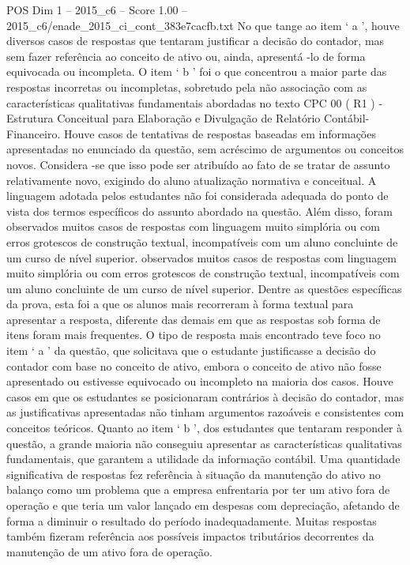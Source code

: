 \begin{textsample}{POS Dim 1 – 2015\_c6 – Score 1.00 – 2015\_c6/enade\_2015\_ci\_cont\_383e7cacfb.txt}
No que tange ao item ‘ a ’, houve diversos casos de respostas que tentaram justificar a decisão do contador, mas sem fazer referência ao conceito de ativo ou, ainda, apresentá -lo de forma equivocada ou incompleta.
O item ‘ b ’ foi o que concentrou a maior parte das respostas incorretas ou incompletas, sobretudo pela não associação com as características qualitativas fundamentais abordadas no texto CPC 00 ( R1 ) - Estrutura Conceitual para Elaboração e Divulgação de Relatório Contábil-Financeiro.
Houve casos de tentativas de respostas baseadas em informações apresentadas no enunciado da questão, sem acréscimo de argumentos ou conceitos novos.
Considera -se que isso pode ser atribuído ao fato de se tratar de assunto relativamente novo, exigindo do aluno atualização normativa e conceitual.
A linguagem adotada pelos estudantes não foi considerada adequada do ponto de vista dos termos específicos do assunto abordado na questão.
Além disso, foram observados muitos casos de respostas com linguagem muito simplória ou com erros grotescos de construção textual, incompatíveis com um aluno concluinte de um curso de nível superior. observados muitos casos de respostas com linguagem muito simplória ou com erros grotescos de construção textual, incompatíveis com um aluno concluinte de um curso de nível superior.
Dentre as questões específicas da prova, esta foi a que os alunos mais recorreram à forma textual para apresentar a resposta, diferente das demais em que as respostas sob forma de itens foram mais frequentes.
O tipo de resposta mais encontrado teve foco no item ‘ a ’ da questão, que solicitava que o estudante justificasse a decisão do contador com base no conceito de ativo, embora o conceito de ativo não fosse apresentado ou estivesse equivocado ou incompleto na maioria dos casos.
Houve casos em que os estudantes se posicionaram contrários à decisão do contador, mas as justificativas apresentadas não tinham argumentos razoáveis e consistentes com conceitos teóricos.
Quanto ao item ‘ b ’, dos estudantes que tentaram responder à questão, a grande maioria não conseguiu apresentar as características qualitativas fundamentais, que garantem a utilidade da informação contábil.
Uma quantidade significativa de respostas fez referência à situação da manutenção do ativo no balanço como um problema que a empresa enfrentaria por ter um ativo fora de operação e que teria um valor lançado em despesas com depreciação, afetando de forma a diminuir o resultado do período inadequadamente.
Muitas respostas também fizeram referência aos possíveis impactos tributários decorrentes da manutenção de um ativo fora de operação.

\end{textsample}
